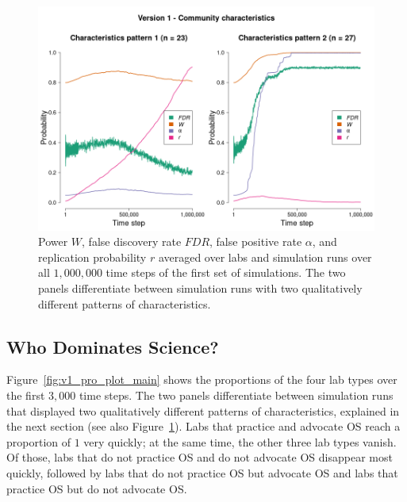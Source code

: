 \documentclass[meta, authordate]{jote-new-article}
\begin{document}
\begin{figure}[!t]
  \begin{fullwidth}
    \centering
    \includegraphics[width=\textwidth]{v1_cha_plot_main.png}
    \caption{Power $W$, false discovery rate $FDR$, false positive rate $\alpha$, and replication probability $r$ averaged over labs and simulation runs over all $1,000,000$ time steps of the first set of simulations. The two panels differentiate between simulation runs with two qualitatively different patterns of characteristics.}
    \label{fig:v1_cha_plot_main}
  \end{fullwidth}
\end{figure}

\subsection{Who Dominates Science?}

Figure~\ref{fig:v1_pro_plot_main} shows the proportions of the four lab types over the first $3,000$ time steps. The two panels differentiate between simulation runs that displayed two qualitatively different patterns of characteristics, explained in the next section (see also Figure~\ref{fig:v1_cha_plot_main}). Labs that practice and advocate OS reach a proportion of $1$ very quickly; at the same time, the other three lab types vanish. Of those, labs that do not practice OS and do not advocate OS disappear most quickly, followed by labs that do not practice OS but advocate OS and labs that practice OS but do not advocate OS.
%
\end{document}
